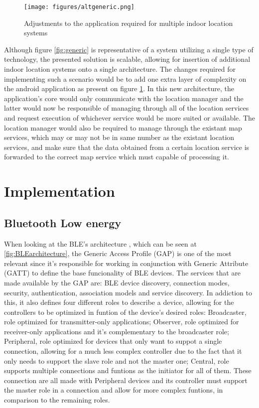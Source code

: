\documentclass[a4paper]{IEEEtran}
\begin{document}
\begin{figure}
	\centering
		\texttt{[image: figures/altgeneric.png]}
	\caption[Adjustments to the application required for multiple indoor location systems]{Adjustments to the application required for multiple indoor location systems}
	\label{fig:altgeneric}
\end{figure}

Although figure \ref{fig:generic} is representative of a system utilizing a single type of technology, the presented solution is scalable, allowing for insertion of additional indoor location systems onto a single architecture. The changes required for implementing such a scenario would be to add one extra layer of complexity on the android application as present on figure \ref{fig:altgeneric}. In this new architecture, the application's core would only communicate with the location manager and the latter would now be responsible of managing through all of the location services and request execution of whichever service would be more suited or available. The location manager would also be required to manage through the existant map services, which may or may not be in same number as the existant location services, and make sure that the data obtained from a certain location service is forwarded to the correct map service which must capable of processing it.

\section{Implementation}
\label{sec:struture}


\subsection{Bluetooth Low energy}
\label{ble}

When looking at the BLE's architecture , which can be seen at \ref{fig:BLEarchitecture}, the Generic Access Profile (GAP) is one of the most relevant since it's responsible for working in conjunction with Generic Attribute (GATT) to define the base funcionality of BLE devices. The services that are made available by the GAP are: BLE device discovery, connection modes, security, authentication, association models and service discovery.
In addiction to this, it also defines four different roles to describe a device, allowing for the controllers to be optimized in funtion of the device's desired roles: 
Broadcaster, role optimized for transmitter-only applications; 
Observer, role optimized for receiver-only applications and it's complementary to the broadcaster role;
Peripheral, role optimized for devices that only want to suppot a single connection, allowing for a much less complex controller due to the fact that it only needs to support the slave role and not the master one; 
Central, role supports multiple connections and funtions as the initiator for all of them. These connection are all made with Peripheral devices and its controller must support the master role in a connection and allow for more complex funtions, in comparison to the remaining roles.
\end{document}
